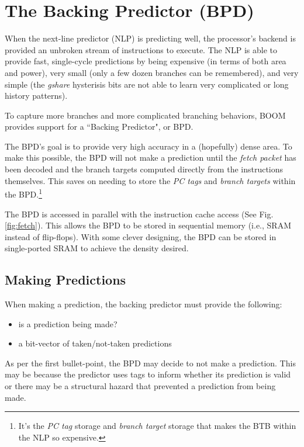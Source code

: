 \section{The Backing Predictor (BPD)}

When the next-line predictor (NLP) is predicting well, the processor's backend is provided an unbroken stream of instructions to execute. The NLP is able to provide fast, single-cycle predictions by being expensive (in terms of both area and power), very small (only a few dozen branches can be remembered), and very simple (the {\em gshare} hysterisis bits are not able to learn very complicated or long history patterns).

To capture more branches and more complicated branching behaviors, BOOM provides support for a ``Backing Predictor", or BPD. 

The BPD's goal is to provide very high accuracy in a (hopefully) dense area.  To make this possible, the BPD will not make a prediction until the {\em fetch packet} has been decoded and the branch targets computed directly from the instructions themselves.  This saves on needing to store the {\em PC tags} and {\em branch targets} within the BPD.\footnote{It's the {\em PC tag} storage and {\em branch target} storage that makes the BTB within the NLP so expensive.}

The BPD is accessed in parallel with the instruction cache access (See Fig. \ref{fig:fetch}).  This allows the BPD to be stored in sequential memory (i.e., SRAM instead of flip-flops). With some clever designing, the BPD can be stored in single-ported SRAM to achieve the density desired.\cite{ev8}

\subsection{Making Predictions}

When making a prediction, the backing predictor must provide the following:

\begin{itemize}
\item is a prediction being made?
\item a bit-vector of taken/not-taken predictions
\end{itemize}

As per the first bullet-point, the BPD may decide to not make a prediction. This may be because the predictor uses tags to inform whether its prediction is valid or there may be a structural hazard that prevented a prediction from being made.

